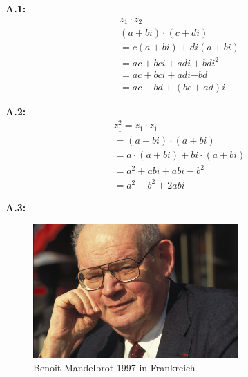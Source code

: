 \renewcommand{\theequation}{A.\arabic{equation}}
\renewcommand{\thefigure}{A.\arabic{figure}}

\noindent\textbf{A.1:}\label{app:1}
\begin{equation}\label{eq:complex-numbers-multiplication}
  \begin{split}
    z_1 \cdot z_2 \\
    (a + bi) \cdot (c + di) \\
    =  c(a + bi) + di(a + bi) \\
    = ac +bci + adi + bdi^2 \\
    = ac + bci + adi \boldsymbol{ - } bd \\
    = ac - bd +(bc + ad)i
  \end{split}
\end{equation}

\noindent\textbf{A.2:}\label{app:2}
\begin{equation}\label{eq:complex-numbes-squaring}
  \begin{split}
    z_1^2
    = z_1 \cdot z_1 \\
    = (a + bi) \cdot (a + bi) \\
    = a \cdot (a + bi) + bi \cdot (a + bi) \\
    = a^2 + abi + abi - b^2 \\
    = a^2 - b^2 + 2abi
  \end{split}
\end{equation}

\noindent\textbf{A.3:}\label{app:3}
\begin{figure}[H]\label{fig:benoit-mandelbrot-picture}
\begin{center}
  \includegraphics[width=0.7\textwidth]{images/benoit-mandelbrot}
  \caption{Benoît Mandelbrot 1997 in Frankreich~\cite{gaillarde_benoit_1997}}
\end{center}
\end{figure}

